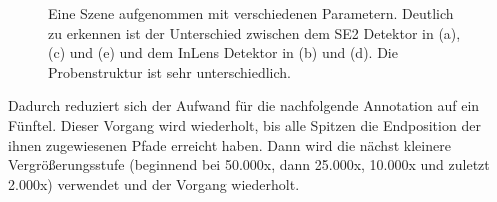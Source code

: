 \begin{figure}[h]
    \centering
    \caption{Eine Szene aufgenommen mit verschiedenen Parametern. Deutlich zu erkennen ist der Unterschied zwischen dem SE2 Detektor in (a), (c) und (e) und dem InLens Detektor in (b) und (d). Die Probenstruktur ist sehr unterschiedlich.}
    \label{fig:augimg}
\end{figure}
Dadurch reduziert sich der Aufwand für die nachfolgende Annotation auf ein Fünftel. Dieser Vorgang wird wiederholt, bis alle Spitzen die Endposition der ihnen zugewiesenen Pfade erreicht haben. Dann wird die nächst kleinere Vergrößerungsstufe (beginnend bei 50.000x, dann 25.000x, 10.000x und zuletzt 2.000x) verwendet und der Vorgang wiederholt.

